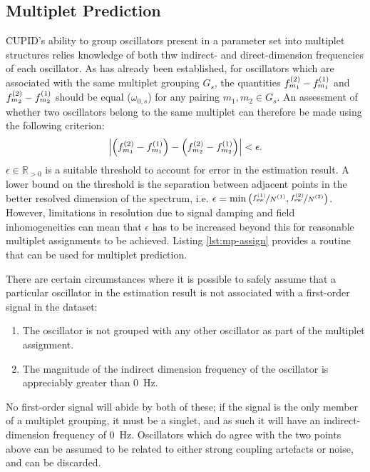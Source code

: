 \subsection{Multiplet Prediction}
\label{subsec:mp-selection}
\ac{CUPID}'s ability to group oscillators present in a parameter set into
multiplet structures relies knowledge of both thw indirect- and
direct-dimension frequencies of each oscillator. As has already been
established, for oscillators which are associated with the same multiplet
grouping $G_s$, the quantities $f^{(2)}_{m_1} - f^{(1)}_{m_1}$ and $f^{(2)}_{m_2} -
f^{(1)}_{m_2}$ should be equal ($\omega_{0,s}$) for any pairing  $m_1, m_2 \in
G_s$. An assessment of whether two oscillators belong to the same multiplet can
therefore be made using the following criterion:
\begin{equation}
    \left \lvert
        \left( f^{(2)}_{m_1} - f^{(1)}_{m_1} \right) -
        \left( f^{(2)}_{m_2} - f^{(1)}_{m_2} \right)
    \right \rvert < \epsilon.
\end{equation}
$\epsilon \in \mathbb{R}_{>0}$ is a suitable threshold to account for error in
the estimation result. A lower bound on the threshold is the separation between
adjacent points in the better resolved dimension of the spectrum, i.e.
$\epsilon = \min\left(\nicefrac{\fswone}{\None},
\nicefrac{\fswtwo}{\Ntwo}\right)$.  However, limitations in resolution due to
signal damping and field inhomogeneities can mean that $\epsilon$ has to be
increased beyond this for reasonable multiplet assignments to be achieved.
Listing \cref{lst:mp-assign} provides a \Python routine that can be used for multiplet
prediction.

There are certain circumstances where it is possible to safely assume that a
particular oscillator in the estimation result is not associated with a
first-order signal in the dataset:
\begin{enumerate}
    \item The oscillator is not grouped with any other oscillator as part of
        the multiplet assignment.
    \item The magnitude of the indirect dimension frequency of the oscillator
        is appreciably greater than \qty{0}{\hertz}.
\end{enumerate}
No first-order signal will abide by both of these; if the signal is the only
member of a multiplet grouping, it must be a singlet, and as such it will have
an indirect-dimension frequency of \qty{0}{\hertz}. Oscillators which do agree
with the two points above can be assumed to be related to either strong
coupling artefacts or noise, and can be discarded.
